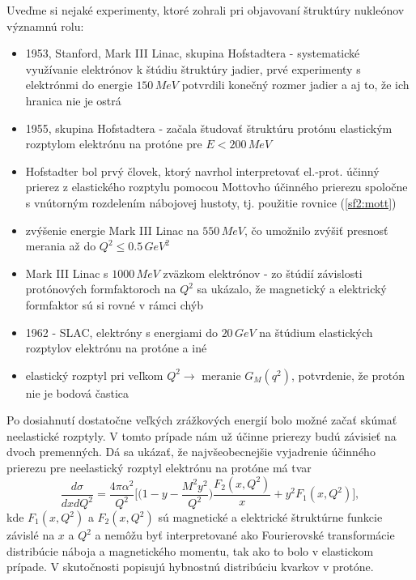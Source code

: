 \documentclass[../../main.tex]{subfiles}
\begin{document}
Uveďme si nejaké experimenty, ktoré zohrali pri objavovaní štruktúry nukleónov významnú rolu:
\begin{itemize}
\item 1953, Stanford, Mark III Linac, skupina Hofstadtera  - systematické využívanie elektrónov k štúdiu štruktúry jadier, prvé experimenty s elektrónmi do energie $150\,\unit{MeV}$ potvrdili konečný rozmer jadier a aj to, že ich hranica nie je ostrá
\item 1955, skupina Hofstadtera - začala študovať štruktúru protónu elastickým rozptylom elektrónu na protóne pre $E < 200\,\unit{MeV}$
\item Hofstadter bol prvý človek, ktorý navrhol interpretovať el.-prot. účinný prierez z elastického rozptylu pomocou Mottovho účinného prierezu spoločne s vnútorným rozdelením nábojovej hustoty, tj. použitie rovnice (\ref{sf2:mott})
\item zvýšenie energie Mark III Linac na $550\,\unit{MeV}$, čo umožnilo zvýšiť presnosť merania až do $Q^2 \leq 0.5\,\unit{GeV^2}$
\item Mark III Linac s $1000\,\unit{MeV}$ zväzkom elektrónov - zo štúdií závislosti protónových formfaktoroch na $Q^2$ sa ukázalo, že magnetický a elektrický formfaktor sú si rovné v rámci chýb
\item 1962 - SLAC, elektróny s energiami do $20\,\unit{GeV}$ na štúdium elastických rozptylov elektrónu na protóne a iné
\item elastický rozptyl pri veľkom $Q^2 \rightarrow$ meranie $G_M(q^2)$, potvrdenie, že protón nie je bodová častica 
\end{itemize}

Po dosiahnutí dostatočne veľkých zrážkových energií bolo možné začať skúmať neelastické rozptyly. V tomto prípade nám už účinne prierezy budú závisieť na dvoch premenných. Dá sa ukázať, že najvšeobecnejšie vyjadrenie účinného prierezu pre neelastický rozptyl elektrónu na protóne má tvar
\begin{equation}
\frac{d\sigma}{dxdQ^2} = \frac{4\pi\alpha^2}{Q^2} \bigg[\bigg( 1-y-\frac{M^2y^2}{Q^2}\bigg)\frac{F_2(x,Q^2)}{x} +y^2F_1(x,Q^2) \bigg],
\label{sf2:blalbla}
\end{equation}
kde $F_1(x,Q^2)$ a $F_2(x,Q^2)$ sú magnetické a elektrické štruktúrne funkcie závislé na $x$ a $Q^2$ a nemôžu byť interpretované ako Fourierovské transformácie distribúcie náboja a magnetického momentu, tak ako to bolo v elastickom prípade. V skutočnosti popisujú hybnostnú distribúciu kvarkov v protóne.
\end{document}
